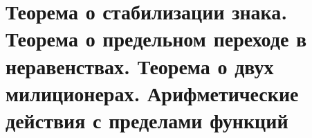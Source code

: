 \section{Теорема о стабилизации знака. Теорема о предельном переходе в неравенствах. Теорема о двух милиционерах. Арифметические действия с пределами функций}